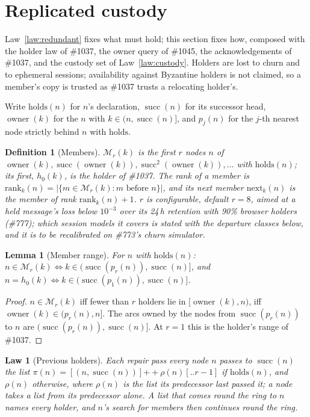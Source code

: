 \documentclass[journal]{IEEEtran}
\newtheorem{definition}{Definition}
\newtheorem{lemma}{Lemma}
\newtheorem{law}{Law}
\newcommand{\issue}[1]{\#{#1}}
\newcommand{\nxt}{\operatorname{succ}}
\newcommand{\own}{\operatorname{owner}}
\newcommand{\Mem}{\mathcal{M}}
\begin{document}
\section{Replicated custody}\label{sec:replicated}

Law~\ref{law:redundant} fixes what must hold; this section fixes how, composed with the
holder law of \issue{1037}, the owner query of \issue{1045}, the acknowledgements of
\issue{1037}, and the custody set of Law~\ref{law:custody}.  Holders are lost to churn and
to ephemeral sessions; availability against Byzantine holders is not claimed, so a member's
copy is trusted as \issue{1037} trusts a relocating holder's.

Write $\mathrm{holds}(n)$ for $n$'s declaration, $\nxt(n)$ for its successor head,
$\own(k)$ for the $n$ with $k\in(n,\nxt(n)]$, and $p_j(n)$ for the $j$-th nearest node
strictly behind $n$ with $\mathrm{holds}$.

\begin{definition}[Members]\label{def:members}
$\Mem_r(k)$ is the first $r$ nodes $n$ of $\own(k),\nxt(\own(k)),\nxt^2(\own(k)),\dots$
with $\mathrm{holds}(n)$; its first, $h_0(k)$, is the holder of \issue{1037}.  The
\emph{rank} of a member is $\mathrm{rank}_k(n)=|\{m\in\Mem_r(k): m\text{ before }n\}|$, and its
\emph{next member} $\mathrm{next}_k(n)$ is the member of rank $\mathrm{rank}_k(n)+1$.  $r$ is
configurable, default $r=8$, aimed at a held message's loss below $10^{-3}$ over its 24\,h
retention with 90\% browser holders (\issue{777}); which session models it covers is stated
with the departure classes below, and it is to be recalibrated on \issue{773}'s churn
simulator.
\end{definition}

\begin{lemma}[Member range]\label{lem:range}
For $n$ with $\mathrm{holds}(n)$: $n\in\Mem_r(k)\iff k\in(\nxt(p_r(n)),\nxt(n)]$, and
$n=h_0(k)\iff k\in(\nxt(p_1(n)),\nxt(n)]$.
\end{lemma}
\begin{proof}
$n\in\Mem_r(k)$ iff fewer than $r$ holders lie in $[\own(k),n)$, iff
$\own(k)\in(p_r(n),n]$.  The arcs owned by the nodes from $\nxt(p_r(n))$ to $n$ are
$(\nxt(p_r(n)),\nxt(n)]$.  At $r=1$ this is the holder's range of \issue{1037}.
\end{proof}

\begin{law}[Previous holders]\label{law:previous}
Each repair pass every node $n$ passes to $\nxt(n)$ the list
$\pi(n)=[(n,\nxt(n))]\mathbin{+\!\!+}\rho(n)[..r-1]$ if $\mathrm{holds}(n)$, and $\rho(n)$
otherwise, where $\rho(n)$ is the list its predecessor last passed it; a node takes a list
from its predecessor alone.  A list that comes round the ring to $n$ names every holder, and
$n$'s search for members then continues round the ring.
\end{law}
\end{document}
